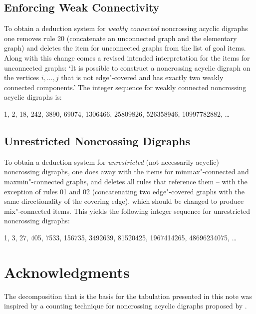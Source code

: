 \documentclass[a4paper]{article}
\begin{document}
\subsection{Enforcing Weak Connectivity}

To obtain a deduction system for \emph{weakly connected} noncrossing acyclic digraphs one removes rule 20 (concatenate an unconnected graph and the elementary graph) and deletes the item for unconnected graphs from the list of goal items.
Along with this change comes a revised intended interpretation for the items for unconnected graphs:
`It is possible to construct a noncrossing acyclic digraph on the vertices $i, \dots, j$ that is not edge"-covered and has exactly two weakly connected components.'
The integer sequence for weakly connected noncrossing acyclic digraphs is:
\begin{center}
	1, 2, 18, 242, 3890, 69074, 1306466, 25809826, 526358946, 10997782882, \dots
\end{center}

\subsection{Unrestricted Noncrossing Digraphs}

To obtain a deduction system for \emph{unrestricted} (not necessarily acyclic) noncrossing digraphs, one does away with the items for minmax"-connected and maxmin"-connected graphs, and deletes all rules that reference them -- with the exception of rules 01 and 02 (concatenating two edge"-covered graphs with the same directionality of the covering edge), which should be changed to produce mix"-connected items.
This yields the following integer sequence for unrestricted noncrossing digraphs:
\begin{center}
	1, 3, 27, 405, 7533, 156735, 3492639, 81520425, 1967414265, 48696234075, \dots
\end{center}


\section*{Acknowledgments}

The decomposition that is the basis for the tabulation presented in this note was inspired by a counting technique for noncrossing acyclic digraphs proposed by \citet{tirrell2014number}.




\end{document}
